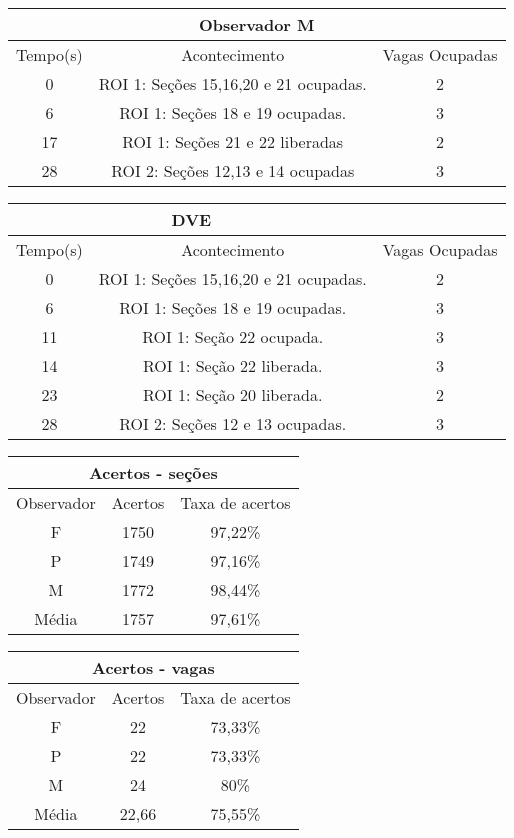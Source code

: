 \begin{center}
\begin{tabular}{|c||c||c|}
\hline
\multicolumn{3}{|c|}{Observador M}  \\ \hline \hline
Tempo(s) & Acontecimento & Vagas Ocupadas\\ \hline
0 & ROI 1: Seções 15,16,20 e 21 ocupadas. & 2 \\ \hline
6 & ROI 1: Seções 18 e 19 ocupadas. & 3 \\ \hline
17 & ROI 1: Seções 21 e 22 liberadas & 2 \\ \hline
28 & ROI 2: Seções 12,13 e 14 ocupadas & 3 \\
\hline
\end{tabular}
\end{center}

\begin{center}
\begin{tabular}{|c||c||c|}
\hline
\multicolumn{2}{|c|}{DVE}  \\ \hline \hline
Tempo(s) & Acontecimento & Vagas Ocupadas\\ \hline
0 & ROI 1: Seções 15,16,20 e 21 ocupadas. & 2 \\ \hline
6 & ROI 1: Seções 18 e 19 ocupadas. & 3 \\ \hline
11 & ROI 1: Seção 22 ocupada. & 3 \\ \hline
14 & ROI 1: Seção 22 liberada. & 3 \\ \hline
23 & ROI 1: Seção 20 liberada. & 2 \\ \hline
28 & ROI 2: Seções 12 e 13 ocupadas. & 3 \\
\hline
\end{tabular}
\end{center}

\begin{center}
\begin{tabular}{|c||c||c|}
\hline
\multicolumn{3}{|c|}{Acertos - seções}  \\ \hline \hline
Observador & Acertos & Taxa de acertos \\ \hline
F & 1750 & 97,22\% \\  \hline
P & 1749 & 97,16\% \\ \hline
M & 1772 & 98,44\% \\ \hline
Média & 1757 & 97,61\% \\
\hline
\end{tabular}
\end{center}

\begin{center}
\begin{tabular}{|c||c||c|}
\hline
\multicolumn{3}{|c|}{Acertos - vagas}  \\ \hline \hline
Observador & Acertos & Taxa de acertos \\ \hline
F & 22 & 73,33\% \\  \hline
P & 22 & 73,33\% \\ \hline
M & 24 & 80\% \\ \hline
Média & 22,66 & 75,55\% \\
\hline
\end{tabular}
\end{center}

